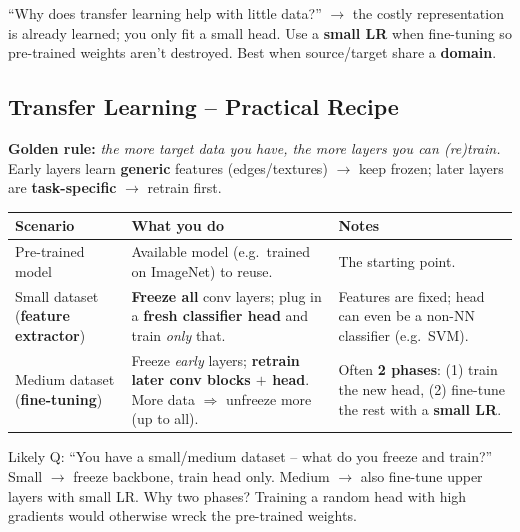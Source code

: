 \documentclass[10pt,a4paper]{article}
\begin{document}
	\begin{examtipbox}
		``Why does transfer learning help with little data?'' $\to$ the costly representation is already learned; you only fit a small head. Use a \textbf{small LR} when fine-tuning so pre-trained weights aren't destroyed. Best when source/target share a \textbf{domain}.
	\end{examtipbox}
	
	\subsection{Transfer Learning -- Practical Recipe}

	\begin{importantbox}
		\textbf{Golden rule:} \emph{the more target data you have, the more layers you can (re)train.} Early layers learn \textbf{generic} features (edges/textures) $\to$ keep frozen; later layers are \textbf{task-specific} $\to$ retrain first.
	\end{importantbox}

	\begin{center}
		\begin{tabular}{@{}p{2.3cm}p{5.5cm}p{6cm}@{}}
			\toprule
			\textbf{Scenario} & \textbf{What you do} & \textbf{Notes} \\
			\midrule
			Pre-trained model & Available model (e.g.\ trained on ImageNet) to reuse. & The starting point. \\
			Small dataset \newline (\textbf{feature extractor}) & \textbf{Freeze all} conv layers; plug in a \textbf{fresh classifier head} and train \emph{only} that. & Features are fixed; head can even be a non-NN classifier (e.g.\ SVM). \\
			Medium dataset \newline (\textbf{fine-tuning}) & Freeze \emph{early} layers; \textbf{retrain later conv blocks $+$ head}. More data $\Rightarrow$ unfreeze more (up to all). & Often \textbf{2 phases}: (1) train the new head, (2) fine-tune the rest with a \textbf{small LR}. \\
			\bottomrule
		\end{tabular}
	\end{center}

	\begin{examtipbox}
		Likely Q: ``You have a small/medium dataset -- what do you freeze and train?'' Small $\to$ freeze backbone, train head only. Medium $\to$ also fine-tune upper layers with small LR. Why two phases? Training a random head with high gradients would otherwise wreck the pre-trained weights.
	\end{examtipbox}
\end{document}

